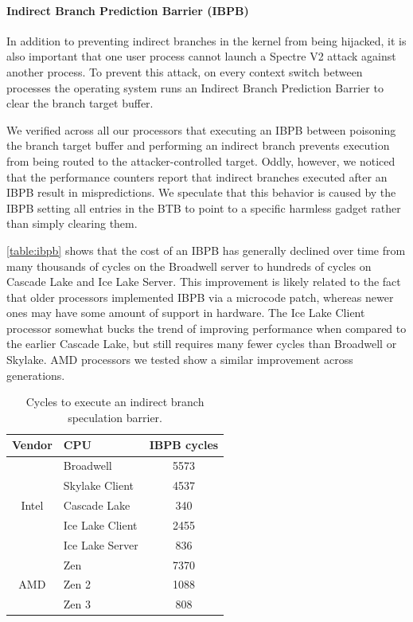 \paragraph{Indirect Branch Prediction Barrier (IBPB)}

In addition to preventing indirect branches in the kernel from being
hijacked, it is also important that one user process cannot launch a Spectre V2 attack against another process.
To prevent this attack, on every context switch between processes the operating system runs an Indirect Branch Prediction Barrier to clear the branch target buffer.

We verified across all our processors that executing an IBPB between poisoning the branch target buffer and performing an indirect branch prevents execution from being routed to the attacker-controlled target.
Oddly, however, we noticed that the performance counters report that indirect branches executed after an IBPB result in mispredictions.
We speculate that this behavior is caused by the IBPB setting all entries in the BTB to point to a specific harmless gadget rather than simply clearing them.

\autoref{table:ibpb} shows that the cost of an IBPB has generally
declined over time from many thousands of cycles on the Broadwell
server to hundreds of cycles on Cascade Lake and Ice Lake Server.
This improvement is likely related to the fact that older processors implemented IBPB via a microcode patch, whereas newer ones may have some amount of support in hardware.
The Ice Lake Client processor somewhat bucks the trend of improving performance when compared to the earlier Cascade Lake, but still requires many fewer cycles than Broadwell or Skylake.
AMD processors we tested show a similar improvement across generations.

\begin{table}[h]
    \begin{center}
    \begin{tabular}{ clc }
      \textbf{Vendor} & \textbf{CPU} & \textbf{IBPB cycles} \\ \hline

      \multirow{5}{*}{Intel} & Broadwell         & 5573 \\
                             & Skylake Client    & 4537 \\
                             & Cascade Lake      & 340 \\
                             & Ice Lake Client   & 2455 \\
                             & Ice Lake Server   & 836 \\ \hline
      \multirow{3}{*}{AMD}   & Zen               & 7370 \\
                             & Zen 2             & 1088 \\
                             & Zen 3             & 808 \\ \hline
    \end{tabular}
    \end{center}
    \caption{Cycles to execute an indirect branch speculation barrier. }
    \label{table:ibpb}
\end{table}

